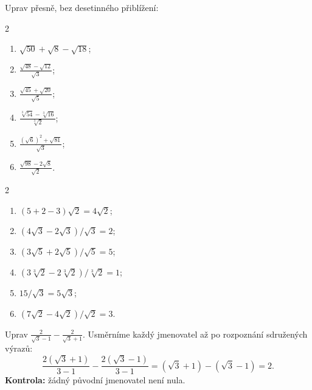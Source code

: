 \documentclass[11pt,a4paper]{article}
\begin{document}
\begin{zadaniReseniBox}[breakable=false,title={Samostatná práce 1}]
Uprav přesně, bez desetinného přiblížení:
\begin{multicols}{2}
\begin{enumerate}[label=\alph*)]
\item $\sqrt{50}+\sqrt8-\sqrt{18}$;
\item $\displaystyle\frac{\sqrt{48}-\sqrt{12}}{\sqrt3}$;
\item $\displaystyle\frac{\sqrt{45}+\sqrt{20}}{\sqrt5}$;
\item $\displaystyle\frac{\sqrt[3]{54}-\sqrt[3]{16}}{\sqrt[3]2}$;
\item $\displaystyle\frac{(\sqrt6)^2+\sqrt{81}}{\sqrt3}$;
\item $\displaystyle\frac{\sqrt{98}-2\sqrt8}{\sqrt2}$.
\end{enumerate}
\end{multicols}
\tcblower
\begin{multicols}{2}
\begin{enumerate}[label=\alph*)]
\item $(5+2-3)\sqrt2=\boxed{4\sqrt2}$;
\item $(4\sqrt3-2\sqrt3)/\sqrt3=\boxed2$;
\item $(3\sqrt5+2\sqrt5)/\sqrt5=\boxed5$;
\item $(3\sqrt[3]2-2\sqrt[3]2)/\sqrt[3]2=\boxed1$;
\item $15/\sqrt3=\boxed{5\sqrt3}$;
\item $(7\sqrt2-4\sqrt2)/\sqrt2=\boxed3$.
\end{enumerate}
\end{multicols}
\end{zadaniReseniBox}

\begin{prikladReseniBox}[breakable=false,title={Příklad 2}]
Uprav $\displaystyle\frac2{\sqrt3-1}-\frac2{\sqrt3+1}$.
\tcblower
Usměrníme každý jmenovatel až po rozpoznání sdružených výrazů:
\[
\frac{2(\sqrt3+1)}{3-1}-\frac{2(\sqrt3-1)}{3-1}
=(\sqrt3+1)-(\sqrt3-1)=\boxed2.
\]
\textbf{Kontrola:} žádný původní jmenovatel není nula.
\end{prikladReseniBox}
\end{document}
